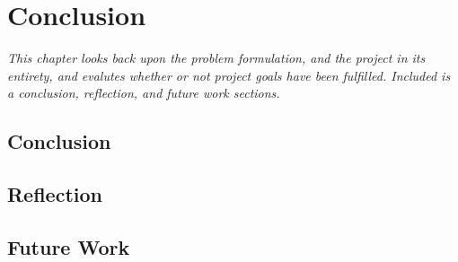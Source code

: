 \chapter{Conclusion}

\textit{This chapter looks back upon the problem formulation, and the project in its entirety, and evalutes whether or not project goals have been fulfilled. Included is a conclusion, reflection, and future work sections.}

\section{Conclusion}
\label{ConclusionSec}

\section{Reflection}
\label{Reflection}

\section{Future Work}
\label{FutureWork}
